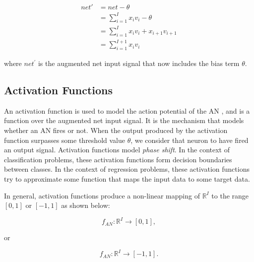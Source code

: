 \begin{equation}
    \begin{split}
        net{'} & = net - \theta \\
             & = \sum_{i=1}^{I} x_i v_i - \theta\\
             & = \sum_{i=1}^{I} x_i v_i + x_{i+1} v_{i+1} \\
             & = \sum_{i=1}^{I+1} x_i v_i
    \label{eq:augmented_vectors}
    \end{split}
\end{equation}

\noindent where $\textit{net}^{'}$ is the augmented net input signal that now
includes the bias term $\theta$.


\subsection{Activation Functions}
\label{sec:anns:an:act_functions}

An activation function is used to model the action
potential of the \ac{AN} \cite{ref:ziv:1994, ref:hodgkin:1952}, and is
a function over the augmented net input signal. It is
the mechanism that models whether an \ac{AN} fires or not. When the
output produced by the activation function surpasses some threshold value
$\theta$, we consider that neuron to have fired an output signal.
Activation functions model \textit{phase shift}. In
the context of classification problems, these activation functions form decision boundaries between classes. In the
context of regression problems, these activation
functions try to approximate some function that maps the input data to some
target data.

In general, activation functions produce a non-linear mapping of
$\mathbb{R}^{I}$ to the range $[0,1]$ or $[-1,1]$ as shown below:

\begin{equation}
    f_{AN}: \mathbb{R}^{I} \rightarrow [0,1],
    \label{eq:an_function_mapping_0_1}
\end{equation}

\noindent or

\begin{equation}
    f_{AN}: \mathbb{R}^{I} \rightarrow [-1,1].
    \label{eq:an_function_mapping_minus_1_1}
\end{equation}


